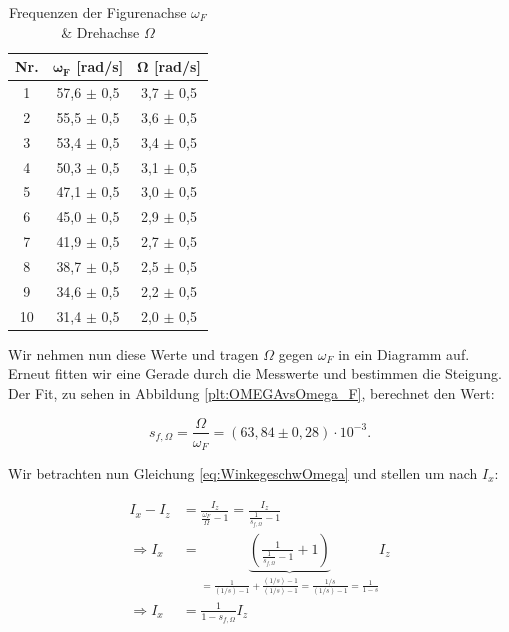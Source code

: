 \documentclass{article}
\begin{document}
\begin{table}[!h]
    \centering
    \begin{tabular}{ccc}
        \hline
        \textbf{Nr.} & $\bm{\omega_F}$ [rad/s] & $\bm{\Omega}$ [rad/s] \\ \hline
             1 &  57,6 $\pm$ 0,5 &     3,7 $\pm$ 0,5 \\
             2 &  55,5 $\pm$ 0,5 &     3,6 $\pm$ 0,5 \\
             3 &  53,4 $\pm$ 0,5 &     3,4 $\pm$ 0,5 \\
             4 &  50,3 $\pm$ 0,5 &     3,1 $\pm$ 0,5 \\
             5 &  47,1 $\pm$ 0,5 &     3,0 $\pm$ 0,5 \\
             6 &  45,0 $\pm$ 0,5 &     2,9 $\pm$ 0,5 \\
             7 &  41,9 $\pm$ 0,5 &     2,7 $\pm$ 0,5 \\
             8 &  38,7 $\pm$ 0,5 &     2,5 $\pm$ 0,5 \\
             9 &  34,6 $\pm$ 0,5 &     2,2 $\pm$ 0,5 \\
            10 &  31,4 $\pm$ 0,5 &     2,0 $\pm$ 0,5 \\ \hline
    \end{tabular}%
    \caption{Frequenzen der Figurenachse $\omega_F$ \& Drehachse $\Omega$}
    \label{tab:w_F-Omega}
\end{table}

\phantom{.}

Wir nehmen nun diese Werte und tragen $\Omega$ gegen $\omega_F$ in ein Diagramm auf. Erneut fitten wir eine Gerade durch die Messwerte und bestimmen die Steigung. Der Fit, zu sehen in Abbildung \ref{plt:OMEGAvsOmega_F}, berechnet den Wert:

\begin{equation}
    s_{f,\Omega} = \frac{\Omega}{\omega_F} = (63,84 \pm 0,28) \cdot 10^{-3}.
\end{equation}

Wir betrachten nun Gleichung \ref{eq:WinkegeschwOmega} und stellen um nach $I_x$:

\begin{equation}
    \begin{split}
        I_x - I_z &= \frac{I_z}{\frac{\omega_F}{\Omega}-1} = \frac{I_z}{\frac{1}{s_{f,\Omega}}-1} \\
        \Rightarrow I_x &= \underbrace{\left( \frac{1}{\frac{1}{s_{f,\Omega}}-1} + 1 \right)}_{= \frac{1}{(1/s)-1}+ \frac{(1/s)-1}{(1/s)-1} = \frac{1/s}{(1/s)-1} = \frac{1}{1-s}} I_z \\
        \Rightarrow I_x &= \frac{1}{1-s_{f,\Omega}} I_z
    \end{split}
\end{equation}
\end{document}

